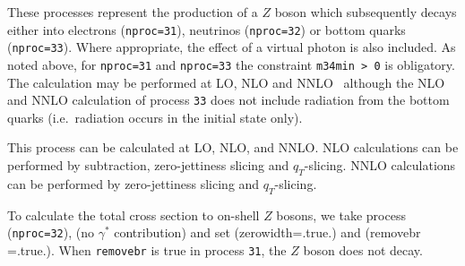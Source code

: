 \label{subsec:zboson}

These processes represent the production of a $Z$ boson which subsequently
decays either into electrons ({\tt nproc=31}), neutrinos ({\tt nproc=32})
or bottom quarks ({\tt nproc=33}). Where appropriate, the effect of a virtual
photon is also included. As noted above, for {\tt nproc=31} and {\tt nproc=33} the constraint
{\tt m34min > 0} is obligatory. The calculation may be performed at LO, NLO
and NNLO~\cite{Boughezal:2016wmq,Campbell:2022gdq}
although the NLO and NNLO calculation of process {\tt 33} does not include radiation
from the bottom quarks (i.e.\ radiation occurs in the initial state only).

This process can be calculated at LO, NLO, and NNLO. NLO calculations
can be performed by subtraction, zero-jettiness slicing and
$q_T$-slicing. NNLO calculations can be performed by zero-jettiness
slicing and $q_T$-slicing.

To calculate the total cross section to on-shell $Z$ bosons, we take 
process ({\tt nproc=32}), (no $\gamma^{*}$ contribution) and 
set (zerowidth=.true.) and (removebr =.true.).
When {\tt removebr} is true in process {\tt 31}, the $Z$ boson does not decay.
